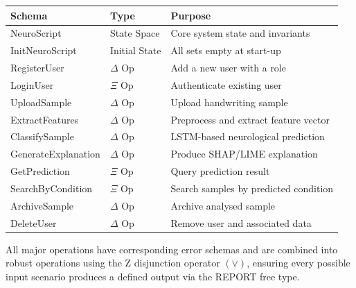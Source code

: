 \documentclass[12pt,a4paper]{article}
\begin{document}
\begin{longtable}{|p{4cm}|p{3cm}|p{7cm}|}
\hline
\textbf{Schema} & \textbf{Type} & \textbf{Purpose} \\
\hline
NeuroScript & State Space & Core system state and invariants \\
\hline
InitNeuroScript & Initial State & All sets empty at start-up \\
\hline
RegisterUser & $\Delta$ Op & Add a new user with a role \\
\hline
LoginUser & $\Xi$ Op & Authenticate existing user \\
\hline
UploadSample & $\Delta$ Op & Upload handwriting sample \\
\hline
ExtractFeatures & $\Delta$ Op & Preprocess and extract feature vector \\
\hline
ClassifySample & $\Delta$ Op & LSTM-based neurological prediction \\
\hline
GenerateExplanation & $\Delta$ Op & Produce SHAP/LIME explanation \\
\hline
GetPrediction & $\Xi$ Op & Query prediction result \\
\hline
SearchByCondition & $\Xi$ Op & Search samples by predicted condition \\
\hline
ArchiveSample & $\Delta$ Op & Archive analysed sample \\
\hline
DeleteUser & $\Delta$ Op & Remove user and associated data \\
\hline
\end{longtable}

\vspace{0.5cm}

All major operations have corresponding error schemas and are combined into robust operations using the Z disjunction operator $(\lor)$, ensuring every possible input scenario produces a defined output via the REPORT free type.
\end{document}
